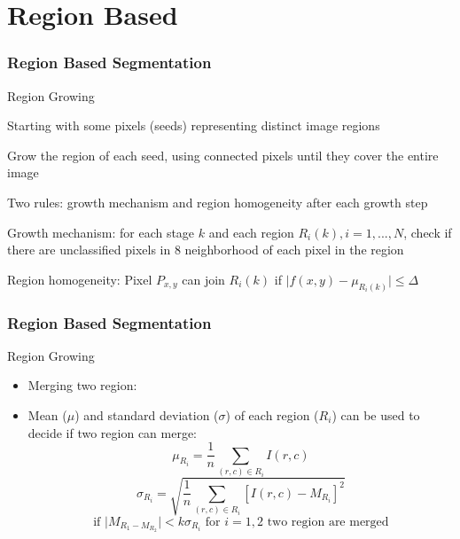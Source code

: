\documentclass{beamer}
\begin{document}
\section{Region Based}
\begin{frame}
\frametitle{Region Based Segmentation}
\begin{block}{Region Growing}
\begin{itemize}
\footnotesize{
\item Starting with some pixels (seeds) representing distinct image regions
\item Grow the region of each seed, using connected pixels until they cover the entire image
\item Two rules: growth mechanism and region homogeneity after each growth step
\item {\color{blue}Growth mechanism: for each stage $k$ and each region $R_{i}(k), i= 1,..., N$, check if there are unclassified pixels in 8 neighborhood of each pixel in the region}
\item Region homogeneity: Pixel $P_{x,y}$ can join $R_{i}(k)$ if $\vert f(x,y) - \mu_{R_{i}(k)} \vert \leq  \Delta $ 
}
\end{itemize}
\end{block}
\end{frame}

\begin{frame}
\frametitle{Region Based Segmentation}
\begin{block}{Region Growing}
\begin{itemize}
\item Merging two region: 
\item Mean ($\mu$) and standard deviation ($\sigma$) of each region ($R_{i}$) can be used to decide if two region can merge: 
$$ \mu_{R_{i}} = \frac{1}{n}\sum\limits_{(r,c)\in R_{i}} I(r,c) $$ 
$$ \sigma_{R_{i}} = \sqrt{\frac{1}{n}\sum\limits_{(r,c) \in R_{i}} [I(r,c) - M_{R_{i}}]^{2}}$$ 
$$\text{if     } \vert M_{R_{1} - M_{R_{2}}} \vert < k \sigma_{R_{i}}  \text{  for  } i= 1,2  \text{  two region are merged} $$ 
\end{itemize}

\end{block}
\end{frame}
\end{document}
